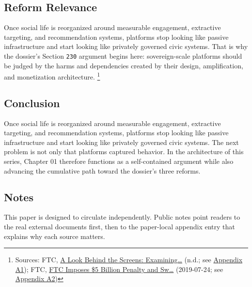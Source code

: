 \documentclass[
  american,
  11pt,
  letterpaper,
]{article}
\begin{document}
\subsection{Reform Relevance}\label{reform-relevance-1}

Once social life is reorganized around measurable engagement, extractive
targeting, and recommendation systems, platforms stop looking like
passive infrastructure and start looking like privately governed civic
systems. That is why the dossier's Section \texttt{230} argument begins
here: sovereign-scale platforms should be judged by the harms and
dependencies created by their design, amplification, and monetization
architecture. \footnote{Sources: FTC,
  \href{https://www.ftc.gov/reports/look-behind-screens-examining-data-practices-social-media-video-streaming-services}{A
  Look Behind the Screens: Examining\ldots{}} (n.d.; see
  \hyperref[ch-01-appendix-a1-a-look-behind-the-screens-examining-the-data-practices-of-social-media-and-video-streaming-services]{Appendix
  A1}); FTC,
  \href{https://www.ftc.gov/news-events/news/press-releases/2019/07/ftc-imposes-5-billion-penalty-sweeping-new-privacy-restrictions-facebook}{FTC
  Imposes \$5 Billion Penalty and Sw\ldots{}} (2019-07-24; see
  \hyperref[ch-01-appendix-a2-ftc-imposes-5-billion-penalty-and-sweeping-new-privacy-restrictions-on-facebook]{Appendix
  A2})}

\subsection{Conclusion}\label{conclusion-1}

Once social life is reorganized around measurable engagement, extractive
targeting, and recommendation systems, platforms stop looking like
passive infrastructure and start looking like privately governed civic
systems. The next problem is not only that platforms captured behavior.
In the architecture of this series, Chapter 01 therefore functions as a
self-contained argument while also advancing the cumulative path toward
the dossier's three reforms.

\subsection{Notes}\label{notes-1}

This paper is designed to circulate independently. Public notes point
readers to the real external documents first, then to the paper-local
appendix entry that explains why each source matters.
\end{document}
